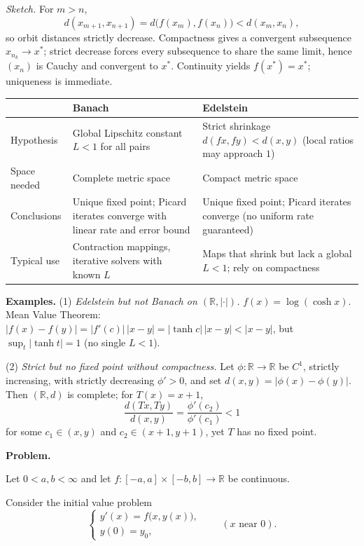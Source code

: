 \documentclass[12pt,a4paper]{article}
\begin{document}
\smallskip
\textit{Sketch.}
For $m>n$,
\[
d(x_{m+1},x_{n+1})=d\big(f(x_{m}),f(x_{n})\big)<d(x_{m},x_{n}),
\]
so orbit distances strictly decrease.
Compactness gives a convergent subsequence $x_{n_{k}}\to x^{*}$; strict decrease forces every subsequence to share the same limit, hence $(x_{n})$ is Cauchy and convergent to $x^{*}$. Continuity yields $f(x^{*})=x^{*}$; uniqueness is immediate.

\medskip
\begin{table}[h]
	\centering
	\begin{tabularx}{\linewidth}{@{} l X X @{}}
		\toprule
		& \textbf{Banach} & \textbf{Edelstein} \\
		\midrule
		Hypothesis & Global Lipschitz constant $L<1$ for all pairs &
		Strict shrinkage $d(fx,fy)<d(x,y)$ (local ratios may approach $1$) \\
		Space needed & Complete metric space & Compact metric space \\
		Conclusions & Unique fixed point; Picard iterates converge with linear rate and error bound &
		Unique fixed point; Picard iterates converge (no uniform rate guaranteed) \\
		Typical use & Contraction mappings, iterative solvers with known $L$ &
		Maps that shrink but lack a global $L<1$; rely on compactness \\
		\bottomrule
	\end{tabularx}
\end{table}

\medskip
\textbf{Examples.}
(1) \emph{Edelstein but not Banach on $(\mathbb R,|\cdot|)$.} $f(x)=\log(\cosh x)$.
Mean Value Theorem: $|f(x)-f(y)|=|f'(c)|\,|x-y|=|\tanh c|\,|x-y|<|x-y|$, but $\sup_{t}|\tanh t|=1$ (no single $L<1$).

(2) \emph{Strict but no fixed point without compactness.}
Let $\phi:\mathbb R\to\mathbb R$ be $C^{1}$, strictly increasing, with strictly decreasing $\phi'>0$, and set $d(x,y)=|\phi(x)-\phi(y)|$.
Then $(\mathbb R,d)$ is complete; for $T(x)=x+1$,
\[
\frac{d(Tx,Ty)}{d(x,y)}=\frac{\phi'(c_{2})}{\phi'(c_{1})}<1
\]
for some $c_{1}\in(x,y)$ and $c_{2}\in(x+1,y+1)$, yet $T$ has no fixed point.
	
	
\textbf{Problem.}

Let $0<a,b<\infty$ and let $f:[-a,a]\times[-b,b]\to\mathbb R$ be continuous.

\medskip

Consider the initial value problem
\[
\begin{cases}
	y'(x)=f\big(x,y(x)\big),\\[2pt]
	y(0)=y_0,
\end{cases}
\qquad (x \text{ near } 0).
\]
\end{document}
